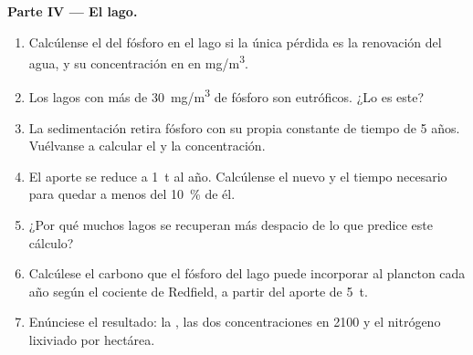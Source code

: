 \begin{problem}
\medskip
\noindent\textbf{Parte IV --- El lago.}
\begin{enumerate}[resume]
  \item Calcúlense el  del fósforo en el lago si la
        única pérdida es la renovación del agua, y su concentración en
         en \unit{mg/m^3}.
  \item Los lagos con más de \qty{30}{mg/m^3} de fósforo son eutróficos.
        ¿Lo es este?
  \item La sedimentación retira fósforo con su propia constante de tiempo
        de 5 años. Vuélvanse a calcular el  y la
        concentración.
  \item El aporte se reduce a \qty{1}{t} al año. Calcúlense el nuevo
         y el tiempo necesario para quedar a menos del
        \qty{10}{\%} de él.
  \item ¿Por qué muchos lagos se recuperan más despacio de lo que predice
        este cálculo?
  \item Calcúlese el carbono que el fósforo del lago puede incorporar al
        plancton cada año según el cociente de Redfield, a partir del
        aporte de \qty{5}{t}.
  \item Enúnciese el resultado: la , las dos
        concentraciones en 2100 y el nitrógeno lixiviado por hectárea.
\end{enumerate}
\end{problem}

